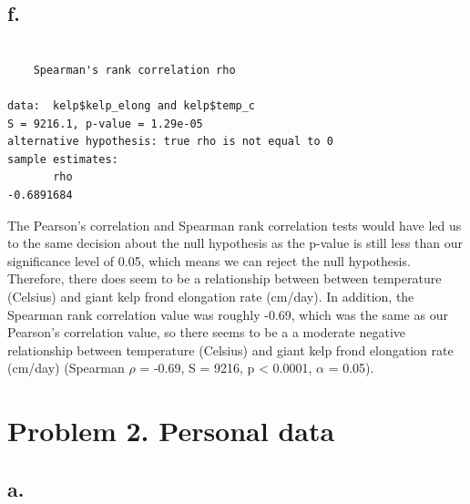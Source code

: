\documentclass[
  letterpaper,
  DIV=11,
  numbers=noendperiod]{scrartcl}
\newenvironment{Shaded}{\begin{snugshade}}{\end{snugshade}}
\newcommand{\AttributeTok}[1]{\textcolor[rgb]{0.40,0.45,0.13}{#1}}
\newcommand{\CommentTok}[1]{\textcolor[rgb]{0.37,0.37,0.37}{#1}}
\newcommand{\ConstantTok}[1]{\textcolor[rgb]{0.56,0.35,0.01}{#1}}
\newcommand{\FunctionTok}[1]{\textcolor[rgb]{0.28,0.35,0.67}{#1}}
\newcommand{\NormalTok}[1]{\textcolor[rgb]{0.00,0.23,0.31}{#1}}
\newcommand{\SpecialCharTok}[1]{\textcolor[rgb]{0.37,0.37,0.37}{#1}}
\newcommand{\StringTok}[1]{\textcolor[rgb]{0.13,0.47,0.30}{#1}}
\begin{document}
\subsection{f.}\label{f.}

\begin{Shaded}
\end{Shaded}

\begin{verbatim}

    Spearman's rank correlation rho

data:  kelp$kelp_elong and kelp$temp_c
S = 9216.1, p-value = 1.29e-05
alternative hypothesis: true rho is not equal to 0
sample estimates:
       rho 
-0.6891684 
\end{verbatim}

The Pearson's correlation and Spearman rank correlation tests would have
led us to the same decision about the null hypothesis as the p-value is
still less than our significance level of 0.05, which means we can
reject the null hypothesis. Therefore, there does seem to be a
relationship between between temperature (Celsius) and giant kelp frond
elongation rate (cm/day). In addition, the Spearman rank correlation
value was roughly -0.69, which was the same as our Pearson's correlation
value, so there seems to be a a moderate negative relationship between
temperature (Celsius) and giant kelp frond elongation rate (cm/day)
(Spearman \(\rho\) = -0.69, S = 9216, p \textless{} 0.0001, \(\alpha\) =
0.05).

\section{Problem 2. Personal data}\label{problem-2.-personal-data}

\subsection{a.}\label{a.-1}
\end{document}
